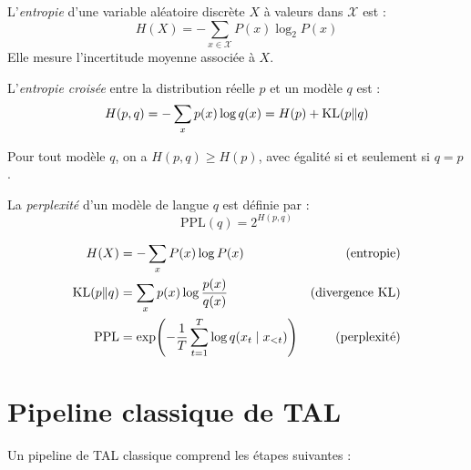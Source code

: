 \begin{definition}[Entropie]
L'\emph{entropie} d'une variable al\'eatoire discr\`ete $X$ \`a valeurs dans
$\mathcal{X}$ est :
\[
H(X) = -\sum_{x \in \mathcal{X}} P(x) \log_2 P(x)
\]
Elle mesure l'incertitude moyenne associ\'ee \`a $X$.
\end{definition}

\begin{definition}
L'\emph{entropie crois\'ee} entre la distribution r\'eelle $p$ et un mod\`ele $q$ est :
\[
H(p, q) = -\sum_{x} p(x) \log q(x) = H(p) + \mathrm{KL}(p \| q)
\]
\end{definition}

\begin{proposition}
Pour tout mod\`ele $q$, on a $H(p, q) \geq H(p)$, avec \'egalit\'e si et
seulement si $q = p$.
\end{proposition}

La \emph{perplexit\'e} d'un mod\`ele de langue $q$ est d\'efinie par :
\[
\text{PPL}(q) = 2^{H(p, q)}
\]

\begin{formules}[title=\textbf{M\'etriques informationnelles cl\'es}]
\begin{align}
H(X) &= -\sum_{x} P(x) \log P(x) & \text{(entropie)} \\
\mathrm{KL}(p \| q) &= \sum_{x} p(x) \log \frac{p(x)}{q(x)} & \text{(divergence KL)} \\
\text{PPL} &= \exp\!\left(-\frac{1}{T}\sum_{t=1}^{T} \log q(x_t \mid x_{<t})\right) & \text{(perplexit\'e)}
\end{align}
\end{formules}

\section{Pipeline classique de TAL}
\label{sec:intro:pipeline}

Un pipeline de TAL classique comprend les \'etapes suivantes :

